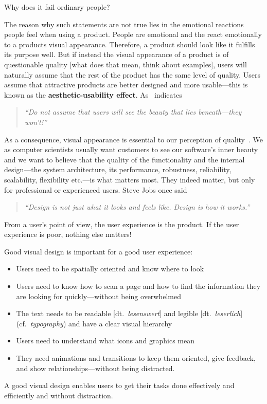 Why does it fail ordinary people?

The reason why such statements are not true lies in the emotional reactions people feel when using a product.  People are emotional and the react emotionally to a products visual appearance. 
Therefore, a product should look like it fulfills its purpose well.
But if instead the visual appearance of a product is of questionable quality [what does that mean, think about examples], users will naturally assume that the rest of the product has the same level of quality. 
Users assume that attractive products are better designed and more usable---this is known as the \textbf{aesthetic-usability effect}. As~\citep{mckay:2013} indicates 
\begin{quote}
	\emph{``Do not assume that users will see the beauty that lies beneath---they won't!''}
\end{quote}

As a consequence, visual appearance is essential to our perception of quality~.
We as computer scientists usually want customers to see our software's inner beauty and we want to believe that the quality of the functionality and the internal design---the system architecture, its performance, robustness, reliability, scalability, flexibility etc.---is what matters most. 
They indeed matter, but only for professional or experienced users.
Steve Jobs once said
\begin{quote}
	\emph{``Design is not just what it looks and feels like. Design is how it works.''}
\end{quote}
From a user's point of view, the user experience is the product.
If the user experience is poor, nothing else matters!

\noindent Good visual design is important for a good user experience:
\begin{itemize}
	\item Users need to be spatially oriented and know where to look
	\item Users need to know how to scan a page and how to find the information they are looking for quickly---without being overwhelmed 
	\item The text needs to be readable [dt.~\emph{lesenswert}] and legible [dt.~\emph{leserlich}] (cf.~\emph{typography}) and have a clear visual hierarchy
	\item Users need to understand what icons and graphics mean
	\item They need animations and transitions to keep them oriented, give feedback, and show relationships---without being distracted.
\end{itemize}
A good visual design enables users to get their tasks done effectively and efficiently and without distraction. 


